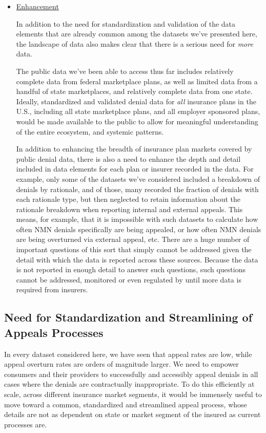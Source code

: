 \documentclass[12pt, a4paper,twoside,parskip=full]{report}
\theoremstyle{plain} %
\theoremstyle{definition} %
\theoremstyle{remark} %
\numberwithin{equation}{chapter}
\begin{document}
\begin{itemize}
			\item \underline{Enhancement}
			
			In addition to the need for standardization and validation of the data elements that are already common among the datasets we've presented here, the landscape of data also makes clear that there is a serious need for \emph{more} data.
			
			The public data we've been able to access thus far includes relatively complete data from federal marketplace plans, as well as limited data from a handful of state marketplaces, and relatively complete data from one state. Ideally, standardized and validated denial data for \emph{all} insurance plans in the U.S., including all state marketplace plans, and all employer sponsored plans, would be made available to the public to allow for meaningful understanding of the entire ecosystem, and systemic patterns.
			
			In addition to enhancing the breadth of insurance plan markets covered by public denial data, there is also a need to enhance the depth and detail included in data elements for each plan or insurer recorded in the data. For example, only some of the datasets we've considered included a breakdown of denials by rationale, and of those, many recorded the fraction of denials with each rationale type, but then neglected to retain information about the rationale breakdown when reporting internal and external appeals. This means, for example, that it is impossible with such datasets to calculate how often NMN denials specifically are being appealed, or how often NMN denials are being overturned via external appeal, etc. There are a huge number of important questions of this sort that simply cannot be addressed given the detail with which the data is reported across these sources. Because the data is not reported in enough detail to answer such questions, such questions cannot be addressed, monitored or even regulated by until more data is required from insurers.
			
		\end{itemize}
		
		\subsection{Need for Standardization and Streamlining of Appeals Processes}
		
		In every dataset considered here, we have seen that appeal rates are low, while appeal overturn rates are orders of magnitude larger. We need to empower consumers and their providers to successfully and accessibly appeal denials in all cases where the denials are contractually inappropriate. To do this efficiently at scale, across different insurance market segments, it would be immensely useful to move toward a common, standardized and streamlined appeal process, whose details are not as dependent on state or market segment of the insured as current processes are.
		
\end{document}
